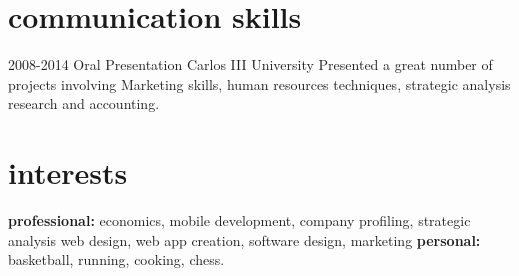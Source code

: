 \documentclass[]{friggeri-cv} %
\begin{document}

\section{communication skills}

\begin{entrylist}
\entry
{2008-2014}
{Oral Presentation}
{Carlos III University}
{Presented a great number of projects involving Marketing skills, human resources techniques, strategic analysis research and accounting.}
\end{entrylist}


\section{interests}

\textbf{professional:} economics, mobile development, company profiling, strategic analysis web design, web app creation, software design, marketing \textbf{personal:} basketball, running, cooking, chess.

\end{document}
